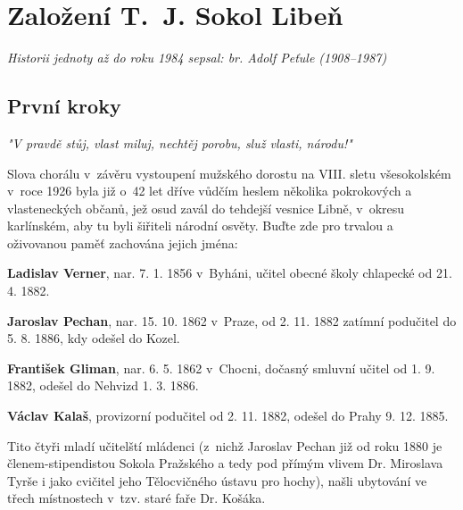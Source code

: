 \documentclass[a5paper, 12pt, twoside]{article}
\begin{document}
\clearpage

\section{Založení T.~J. Sokol Libeň}
\vspace{\baselineskip}

\textit{Historii jednoty až do roku 1984 sepsal: br. Adolf Peťule (1908–1987)}

\subsection{První kroky}

\begin{center}
  \textit{"V pravdě stůj, vlast miluj, nechtěj porobu, služ vlasti, národu!"}
\end{center}
\noindent Slova chorálu v~závěru vystoupení mužského dorostu na VIII. sletu všesokolském v~roce 1926 byla již o~42 let dříve vůdčím heslem několika pokrokových a vlasteneckých občanů, jež osud zavál do tehdejší vesnice Libně, v~okresu karlínském, aby tu byli šiřiteli národní osvěty. Buďte zde pro trvalou a oživovanou paměť zachována jejich jména:

\textbf{Ladislav Verner}, nar. 7. 1. 1856 v~Byháni, učitel obecné školy chlapecké od 21. 4. 1882.

\textbf{Jaroslav Pechan}, nar. 15. 10. 1862 v~Praze, od 2. 11. 1882 zatímní podučitel do 5. 8. 1886, kdy odešel do Kozel.

\textbf{František Gliman}, nar. 6. 5. 1862 v~Chocni, dočasný smluvní učitel od 1. 9. 1882, odešel do Nehvizd 1. 3. 1886.

\textbf{Václav Kalaš}, provizorní podučitel od 2. 11. 1882, odešel do Prahy 9. 12. 1885.

Tito čtyři mladí učitelští mládenci (z~nichž Jaroslav Pechan již od roku 1880 je členem-stipendistou Sokola Pražského a tedy pod přímým vlivem Dr. Miroslava Tyrše i jako cvičitel jeho Tělocvičného ústavu pro hochy), našli ubytování ve třech místnostech v~tzv. staré faře Dr. Košáka.
\end{document}
